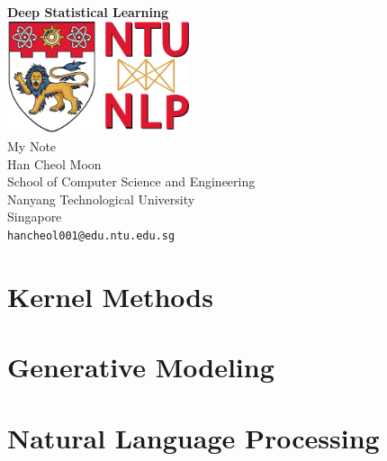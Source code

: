 \documentclass[oneside, a4paper,11pt]{book}
\begin{document}
\begin{titlepage}
	\begin{center}
		\vspace*{5.5cm}
		\textbf{\Huge Deep Statistical Learning}\\
        \vspace{2.5cm}
		\includegraphics[width=0.4\textwidth]{./logo/ntunlp_logo.png}\\
        \vspace{1.5cm}
        \Large My Note \\
        \vspace{1.5cm}
		Han Cheol Moon\\
		School of Computer Science and Engineering\\
		Nanyang Technological University\\
		Singapore\\
		\texttt{hancheol001@edu.ntu.edu.sg}
            
		\date{\today}
	\end{center}
\end{titlepage}

\tableofcontents
\newpage


\mainmatter




\part{Kernel Methods}



% 
\part{Generative Modeling}






% 

\part{Natural Language Processing}


\backmatter

\nocite{*}


\end{document}
